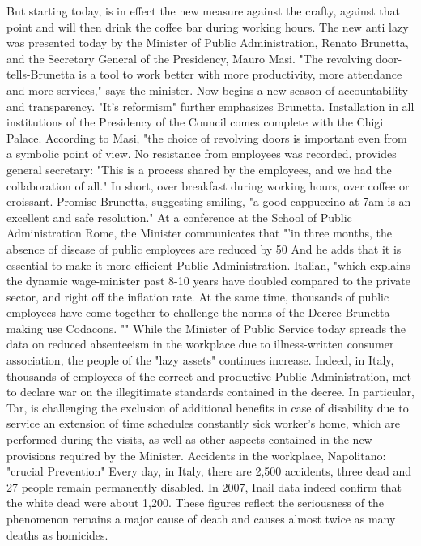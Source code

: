 But starting today, is in effect the new measure against the crafty, against that point and will then drink the coffee bar during working hours.
The new anti lazy was presented today by the Minister of Public Administration, Renato Brunetta, and the Secretary General of the Presidency, Mauro Masi.
"The revolving door-tells-Brunetta is a tool to work better with more productivity, more attendance and more services," says the minister.
Now begins a new season of accountability and transparency.
"It's reformism" further emphasizes Brunetta.
Installation in all institutions of the Presidency of the Council comes complete with the Chigi Palace.
According to Masi, "the choice of revolving doors is important even from a symbolic point of view.
No resistance from employees was recorded, provides general secretary: "This is a process shared by the employees, and we had the collaboration of all."
In short, over breakfast during working hours, over coffee or croissant.
Promise Brunetta, suggesting smiling, "a good cappuccino at 7am is an excellent and safe resolution."
At a conference at the School of Public Administration
Rome, the Minister communicates that "'in three months, the absence of disease of public employees are reduced by 50%
And he adds that it is essential to make it more efficient Public Administration.
Italian, "which explains the dynamic wage-minister past 8-10 years have doubled compared to the private sector, and right off the inflation rate.
At the same time, thousands of public employees have come together to challenge the norms of the Decree Brunetta making use Codacons.
"" While the Minister of Public Service today spreads the data on reduced absenteeism in the workplace due to illness-written consumer association, the people of the "lazy assets" continues increase.
Indeed, in Italy, thousands of employees of the correct and productive Public Administration, met to declare war on the illegitimate standards contained in the decree.
In particular, Tar, is challenging the exclusion of additional benefits in case of disability due to service an extension of time schedules constantly sick worker's home, which are performed during the visits, as well as other aspects contained in the new provisions required by the Minister.
Accidents in the workplace, Napolitano: "crucial Prevention"
Every day, in Italy, there are 2,500 accidents, three dead and 27 people remain permanently disabled.
In 2007, Inail data indeed confirm that the white dead were about 1,200.
These figures reflect the seriousness of the phenomenon remains a major cause of death and causes almost twice as many deaths as homicides.
